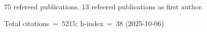 75 refereed publications. 13 refeered publications as first author.

Total citations~=~5215; h-index~=~38 (2025-10-06)